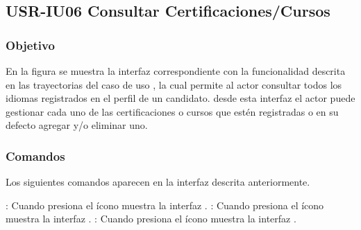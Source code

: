 \clearpage
\subsection{USR-IU06 Consultar Certificaciones/Cursos}

\subsubsection{Objetivo}
En la figura  se muestra la interfaz correspondiente con la funcionalidad descrita en las
trayectorias del caso de uso , la cual permite al actor consultar todos los idiomas registrados en el perfil de un candidato.
desde esta interfaz el actor puede gestionar cada uno de las certificaciones o cursos que estén registradas o en su defecto agregar y/o eliminar uno.

\subsubsection{Comandos}
Los siguientes comandos aparecen en la interfaz descrita anteriormente.

\Titem \IUAgregar{} : Cuando presiona el ícono muestra la interfaz .
\Titem \IUEditar{} : Cuando presiona el ícono muestra la interfaz .
\Titem \IUEliminar{} : Cuando presiona el ícono muestra la interfaz .

\clearpage
